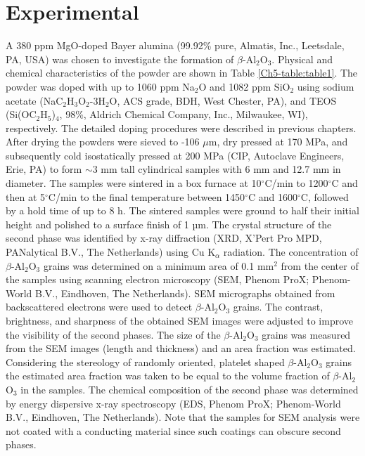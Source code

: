 \section{Experimental}
A 380 ppm MgO-doped Bayer alumina (99.92\% pure, Almatis, Inc., Leetsdale, PA, USA) was chosen to investigate the formation of $\beta$-Al$_{2}$O$_{3}$. Physical and chemical characteristics of the powder are shown in Table \ref{Ch5-table:table1}. The powder was doped with up to 1060 ppm Na$_{2}$O and 1082 ppm SiO$_{2}$ using sodium acetate (NaC$_{2}$H$_{3}$O$_{2}$-3H$_{2}$O, ACS grade, BDH, West Chester, PA), and TEOS (Si(OC$_{2}$H$_{5}$)$_{4}$, 98\%, Aldrich Chemical Company, Inc., Milwaukee, WI), respectively. The detailed doping procedures were described in previous chapters. After drying the powders were sieved to -106 $\mu$m, dry pressed at 170 MPa, and subsequently cold isostatically pressed at 200 MPa (CIP, Autoclave Engineers, Erie, PA) to form $\sim$3 mm tall cylindrical samples with 6 mm and 12.7 mm in diameter. The samples were sintered in a box furnace at 10$^{\circ}$C/min to 1200$^{\circ}$C and then at 5$^{\circ}$C/min to the final temperature between 1450$^{\circ}$C and 1600$^{\circ}$C, followed by a hold time of up to 8 h. The sintered samples were ground to half their initial height and polished to a surface finish of 1 µm. The crystal structure of the second phase was identified by x-ray diffraction (XRD, X'Pert Pro MPD, PANalytical B.V., The Netherlands) using Cu K$_{\alpha}$ radiation. The concentration of $\beta$-Al$_{2}$O$_{3}$ grains was determined on a minimum area of 0.1 mm$^{2}$ from the center of the samples using scanning electron microscopy (SEM, Phenom ProX; Phenom-World B.V., Eindhoven, The Netherlands). SEM micrographs obtained from backscattered electrons were used to detect $\beta$-Al$_{2}$O$_{3}$ grains. The contrast, brightness, and sharpness of the obtained SEM images were adjusted to improve the visibility of the second phases. The size of the $\beta$-Al$_{2}$O$_{3}$ grains was measured from the SEM images (length and thickness) and an area fraction was estimated. Considering the stereology of randomly oriented, platelet shaped $\beta$-Al$_{2}$O$_{3}$ grains \cite{Underwood1972} the estimated area fraction was taken to be equal to the volume fraction of $\beta$-Al$_{2}$O$_{3}$ in the samples. The chemical composition of the second phase was determined by energy dispersive x-ray spectroscopy (EDS, Phenom ProX; Phenom-World B.V., Eindhoven, The Netherlands). Note that the samples for SEM analysis were not coated with a conducting material since such coatings can obscure second phases. 

